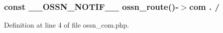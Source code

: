 \subsubsection[{\texorpdfstring{\+\_\+\+\_\+\+O\+S\+S\+N\+\_\+\+N\+O\+T\+I\+F\+\_\+\+\_\+}{__OSSN_NOTIF__}}]{\setlength{\rightskip}{0pt plus 5cm}const \+\_\+\+\_\+\+O\+S\+S\+N\+\_\+\+N\+O\+T\+I\+F\+\_\+\+\_\+ {\bf ossn\+\_\+route}()-\/$>$com . /\textquotesingle{}}\hypertarget{_ossn_notifications_2ossn__com_8php_a26ea7c347c5bef85df640f59c5995fa6}{}\label{_ossn_notifications_2ossn__com_8php_a26ea7c347c5bef85df640f59c5995fa6}


Definition at line 4 of file ossn\+\_\+com.\+php.

